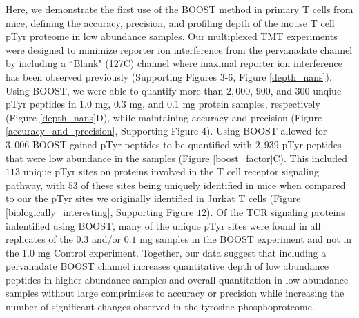 \documentclass[journal=jprobs,manuscript=article]{achemso}
\begin{document}
 Here, we demonstrate the first use of the BOOST method in primary T cells from mice, defining the accuracy, precision, and profiling depth of the mouse T cell pTyr proteome in low abundance samples. Our multiplexed TMT experiments were designed to minimize reporter ion interference from the pervanadate channel by including a ``Blank" (127C) channel where maximal reporter ion interference has been observed previously (Supporting Figures $3$-$6$, Figure \ref{depth_nans})\cite{chua2021ovalbumin,stopfer2021quantitative}. Using BOOST, we were able to quantify more than $2{,}000$, $900$, and $300$ unqiue pTyr peptides in $1.0$ mg, $0.3$ mg, and $0.1$ mg protein samples, respectively (Figure \ref{depth_nans}D), while maintaining accuracy and precision (Figure \ref{accuracy_and_precision}, Supporting Figure $4$). Using BOOST allowed for $3{,}006$ BOOST-gained pTyr peptides to be quantified with $2{,}939$ pTyr peptides that were low abundance in the samples (Figure \ref{boost_factor}C). This included $113$ unique pTyr sites on proteins involved in the T cell receptor signaling pathway, with $53$ of these sites being uniquely identified in mice when compared to our the pTyr sites we originally identified in Jurkat T cells (Figure \ref{biologically_interesting}, Supporting Figure $12$)\cite{chua2020tandem}. Of the TCR signaling proteins indentified using BOOST, many of the unique pTyr sites were found in all replicates of the $0.3$ and/or $0.1$ mg samples in the BOOST experiment and not in the $1.0$ mg Control experiment. Together, our data suggest that including a pervanadate BOOST channel increases quantitative depth of low abundance peptides in higher abundance samples and overall quantitation in low abundance samples without large comprimises to accuracy or precision while increasing the number of significant changes observed in the tyrosine phosphoproteome.
\end{document}
